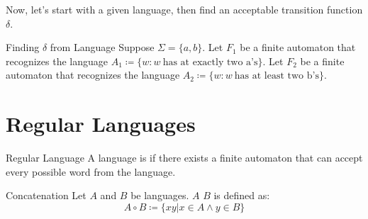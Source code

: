 \documentclass[12pt]{report}
\begin{document}
Now, let's start with a given language, then find an acceptable transition function $\delta$.
\begin{exbox}{Finding $\delta$ from Language}{}
    Suppose $\Sigma = \{a, b\}$. Let $F_1$ be a finite automaton that recognizes the language $A_1 \coloneq \{w : w\ \text{has at exactly two a's} \}$. Let $F_2$ be a finite automaton that recognizes the language $A_2 \coloneq \{w : w\ \text{has at least two b's} \}$.


\end{exbox}

\chapter{Regular Languages}

\begin{dfnbox}{Regular Language}{}
    A language is  if there exists a finite automaton that can accept every possible word from the language.
\end{dfnbox}

\begin{dfnbox}{Concatenation}{}
    Let $A$ and $B$ be languages. $A$  $B$ is defined as:
    \[ A \circ B \coloneq \{ xy | x \in A \land y \in B \}  \]
\end{dfnbox}
\end{document}
